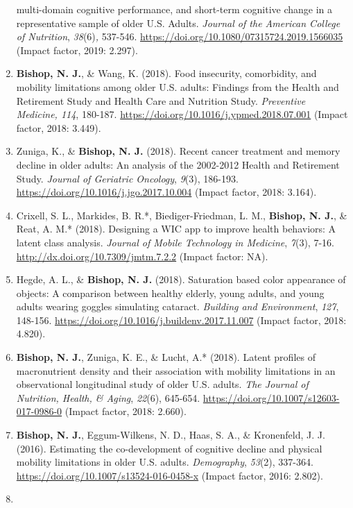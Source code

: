 \documentclass[
]{article}
\begin{document}
\begin{enumerate}
  multi-domain cognitive performance, and short-term cognitive change in
  a representative sample of older U.S. Adults. \emph{Journal of the
  American College of Nutrition}, \emph{38}(6)\emph{,} 537-546.
  \url{https://doi.org/10.1080/07315724.2019.1566035} (Impact factor,
  2019: 2.297).
\item
  \textbf{Bishop, N. J.}, \& Wang, K. (2018). Food insecurity,
  comorbidity, and mobility limitations among older U.S. adults:
  Findings from the Health and Retirement Study and Health Care and
  Nutrition Study. \emph{Preventive Medicine, 114}, 180-187.
  \url{https://doi.org/10.1016/j.ypmed.2018.07.001} (Impact factor,
  2018: 3.449).
\item
  Zuniga, K., \& \textbf{Bishop, N. J.} (2018). Recent cancer treatment
  and memory decline in older adults: An analysis of the 2002-2012
  Health and Retirement Study. \emph{Journal of Geriatric Oncology},
  \emph{9}(3), 186-193. \url{https://doi.org/10.1016/j.jgo.2017.10.004}
  (Impact factor, 2018: 3.164).
\item
  Crixell, S. L., Markides, B. R.*, Biediger-Friedman, L. M.,
  \textbf{Bishop, N. J.}, \& Reat, A. M.* (2018). Designing a WIC app to
  improve health behaviors: A latent class analysis. \emph{Journal of
  Mobile Technology in Medicine}, \emph{7}(3), 7-16.
  \url{http://dx.doi.org/10.7309/jmtm.7.2.2} (Impact factor: NA).
\item
  Hegde, A. L., \& \textbf{Bishop, N. J.} (2018). Saturation based color
  appearance of objects: A comparison between healthy elderly, young
  adults, and young adults wearing goggles simulating cataract.
  \emph{Building and Environment}, \emph{127}, 148-156.
  \url{https://doi.org/10.1016/j.buildenv.2017.11.007} (Impact factor,
  2018: 4.820).
\item
  \textbf{Bishop, N. J.}, Zuniga, K. E., \& Lucht, A.* (2018). Latent
  profiles of macronutrient density and their association with mobility
  limitations in an observational longitudinal study of older U.S.
  adults. \emph{The Journal of Nutrition, Health, \& Aging},
  \emph{22}(6), 645-654. \url{https://doi.org/10.1007/s12603-017-0986-0}
  (Impact factor, 2018: 2.660).
\item
  \textbf{Bishop, N. J.}, Eggum-Wilkens, N. D., Haas, S. A., \&
  Kronenfeld, J. J. (2016). Estimating the co-development of cognitive
  decline and physical mobility limitations in older U.S. adults.
  \emph{Demography}, \emph{53}(2), 337-364.
  \url{https://doi.org/10.1007/s13524-016-0458-x} (Impact factor, 2016:
  2.802).
\item

\end{enumerate}
\end{document}
